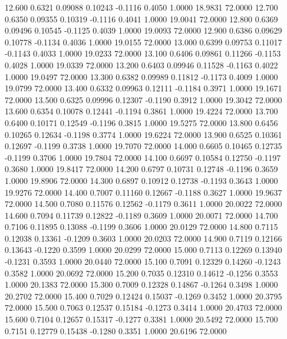   12.600   0.6321   0.09088   0.10243  -0.1116   0.4050   1.0000  18.9831  72.0000
  12.700   0.6350   0.09355   0.10319  -0.1116   0.4041   1.0000  19.0041  72.0000
  12.800   0.6369   0.09496   0.10545  -0.1125   0.4039   1.0000  19.0093  72.0000
  12.900   0.6386   0.09629   0.10778  -0.1134   0.4036   1.0000  19.0155  72.0000
  13.000   0.6399   0.09753   0.11017  -0.1143   0.4033   1.0000  19.0233  72.0000
  13.100   0.6406   0.09861   0.11266  -0.1153   0.4028   1.0000  19.0339  72.0000
  13.200   0.6403   0.09946   0.11528  -0.1163   0.4022   1.0000  19.0497  72.0000
  13.300   0.6382   0.09989   0.11812  -0.1173   0.4009   1.0000  19.0799  72.0000
  13.400   0.6332   0.09963   0.12111  -0.1184   0.3971   1.0000  19.1671  72.0000
  13.500   0.6325   0.09996   0.12307  -0.1190   0.3912   1.0000  19.3042  72.0000
  13.600   0.6354   0.10078   0.12441  -0.1194   0.3861   1.0000  19.4224  72.0000
  13.700   0.6400   0.10171   0.12549  -0.1196   0.3815   1.0000  19.5275  72.0000
  13.800   0.6456   0.10265   0.12634  -0.1198   0.3774   1.0000  19.6224  72.0000
  13.900   0.6525   0.10361   0.12697  -0.1199   0.3738   1.0000  19.7070  72.0000
  14.000   0.6605   0.10465   0.12735  -0.1199   0.3706   1.0000  19.7804  72.0000
  14.100   0.6697   0.10584   0.12750  -0.1197   0.3680   1.0000  19.8417  72.0000
  14.200   0.6797   0.10731   0.12748  -0.1196   0.3659   1.0000  19.8906  72.0000
  14.300   0.6897   0.10912   0.12738  -0.1193   0.3643   1.0000  19.9276  72.0000
  14.400   0.7007   0.11160   0.12667  -0.1188   0.3627   1.0000  19.9637  72.0000
  14.500   0.7080   0.11576   0.12562  -0.1179   0.3611   1.0000  20.0022  72.0000
  14.600   0.7094   0.11739   0.12822  -0.1189   0.3609   1.0000  20.0071  72.0000
  14.700   0.7106   0.11895   0.13088  -0.1199   0.3606   1.0000  20.0129  72.0000
  14.800   0.7115   0.12038   0.13361  -0.1209   0.3603   1.0000  20.0203  72.0000
  14.900   0.7119   0.12166   0.13643  -0.1220   0.3599   1.0000  20.0299  72.0000
  15.000   0.7113   0.12269   0.13940  -0.1231   0.3593   1.0000  20.0440  72.0000
  15.100   0.7091   0.12329   0.14260  -0.1243   0.3582   1.0000  20.0692  72.0000
  15.200   0.7035   0.12310   0.14612  -0.1256   0.3553   1.0000  20.1383  72.0000
  15.300   0.7009   0.12328   0.14867  -0.1264   0.3498   1.0000  20.2702  72.0000
  15.400   0.7029   0.12424   0.15037  -0.1269   0.3452   1.0000  20.3795  72.0000
  15.500   0.7063   0.12537   0.15184  -0.1273   0.3414   1.0000  20.4703  72.0000
  15.600   0.7104   0.12657   0.15317  -0.1277   0.3381   1.0000  20.5492  72.0000
  15.700   0.7151   0.12779   0.15438  -0.1280   0.3351   1.0000  20.6196  72.0000
